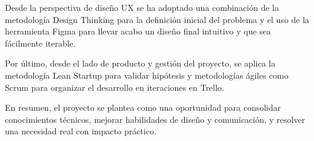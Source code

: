 Desde la perspectiva de diseño UX se ha adoptado una combinación de la metodología Design Thinking para la definición inicial del problema y el uso de la herramienta Figma para llevar acabo un diseño final intuitivo y que sea fácilmente iterable.

Por último, desde el lado de producto y gestión del proyecto, se aplica la metodología Lean Startup para validar hipótesis y metodologías ágiles como Scrum para organizar el desarrollo en iteraciones en Trello.

En resumen, el proyecto se plantea como una oportunidad para consolidar conocimientos técnicos, mejorar habilidades de diseño y comunicación, y resolver una necesidad real con impacto práctico.

